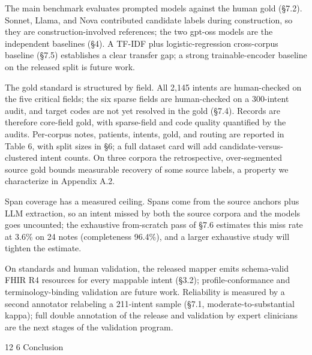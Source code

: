 \documentclass[3p,twocolumn]{elsarticle}
\makeatletter
\renewcommand\section{\@startsection {section}{1}{\z@}%
    {12\p@ \@plus 4\p@ \@minus 4\p@}%
    {6\p@ \@plus 4\p@ \@minus 3\p@}%
    {\normalsize\bfseries\boldmath}}
\makeatother
\begin{document}
The main benchmark evaluates prompted models against the human gold (§7.2). Sonnet, Llama, and Nova contributed candidate labels during construction, so they are construction-involved references; the two gpt-oss models are the independent baselines (§4). A TF-IDF plus logistic-regression cross-corpus baseline (§7.5) establishes a clear transfer gap; a strong trainable-encoder baseline on the released split is future work.

The gold standard is structured by field. All 2,145 intents are human-checked on the five critical fields; the six sparse fields are human-checked on a 300-intent audit, and target codes are not yet resolved in the gold (§7.4). Records are therefore core-field gold, with sparse-field and code quality quantified by the audits. Per-corpus notes, patients, intents, gold, and routing are reported in Table 6, with split sizes in §6; a full dataset card will add candidate-versus-clustered intent counts. On three corpora the retrospective, over-segmented source gold bounds measurable recovery of some source labels, a property we characterize in Appendix A.2.

Span coverage has a measured ceiling. Spans come from the source anchors plus LLM extraction, so an intent missed by both the source corpora and the models goes uncounted; the exhaustive from-scratch pass of §7.6 estimates this miss rate at 3.6\% on 24 notes (completeness 96.4\%), and a larger exhaustive study will tighten the estimate.

On standards and human validation, the released mapper emits schema-valid FHIR R4 resources for every mappable intent (§3.2); profile-conformance and terminology-binding validation are future work. Reliability is measured by a second annotator relabeling a 211-intent sample (§7.1, moderate-to-substantial kappa); full double annotation of the release and validation by expert clinicians are the next stages of the validation program.

\section{Conclusion}\label{conclusion}
\end{document}
